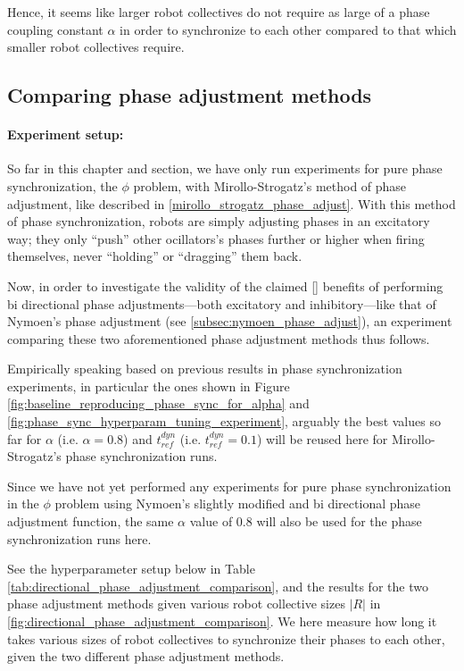 		Hence, it seems like larger robot collectives do not require as large of a phase coupling constant $\alpha$ in order to synchronize to each other compared to that which smaller robot collectives require.
	
	
	\subsection{Comparing phase adjustment methods}
	
		\paragraph{Experiment setup:\nl}
		
		So far in this chapter and section, we have only run experiments for pure phase synchronization, the $\phi$ problem, with Mirollo-Strogatz's method of phase adjustment, like described in \ref{mirollo_strogatz_phase_adjust}. With this method of phase synchronization, robots are simply adjusting phases in an excitatory way; they only ``push'' other ocillators's phases further or higher when firing themselves, never ``holding'' or ``dragging'' them back.
		
		Now, in order to investigate the validity of the claimed [] benefits of performing bi directional phase adjustments—both excitatory and inhibitory—like that of Nymoen's phase adjustment (see \ref{subsec:nymoen_phase_adjust}), an experiment comparing these two aforementioned phase adjustment methods thus follows.
		
		Empirically speaking based on previous results in phase synchronization experiments, in particular the ones shown in Figure \ref{fig:baseline_reproducing_phase_sync_for_alpha} and \ref{fig:phase_sync_hyperparam_tuning_experiment}, arguably the best values so far for $\alpha$ (i.e. $\alpha=0.8$) and $t_{ref}^{dyn}$ (i.e. $t_{ref}^{dyn}=0.1$) will be reused here for Mirollo-Strogatz's phase synchronization runs.
		
		Since we have not yet performed any experiments for pure phase synchronization in the $\phi$ problem using Nymoen's slightly modified and bi directional phase adjustment function, the same $\alpha$ value of 0.8 will also be used for the phase synchronization runs here.
		
		See the hyperparameter setup below in Table \ref{tab:directional_phase_adjustment_comparison}, and the results for the two phase adjustment methods given various robot collective sizes $|R|$ in \ref{fig:directional_phase_adjustment_comparison}. We here measure how long it takes various sizes of robot collectives to synchronize their phases to each other, given the two different phase adjustment methods.
		
